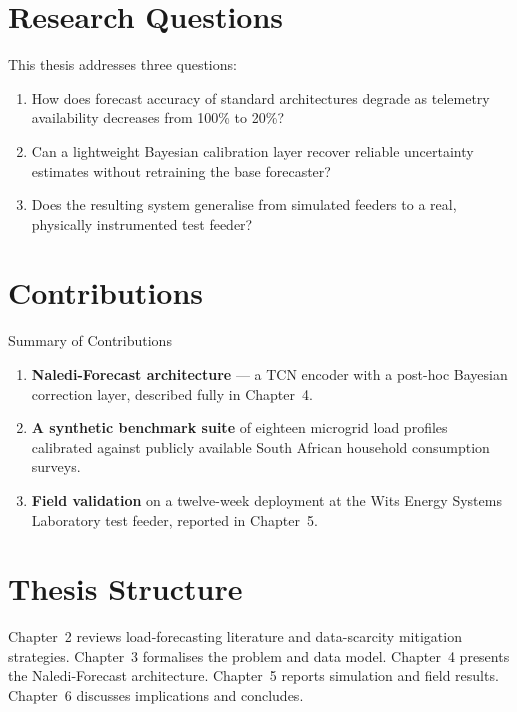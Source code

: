 \documentclass[12pt,a4paper]{report}
\begin{document}
\section{Research Questions}
This thesis addresses three questions:
\begin{enumerate}
  \item How does forecast accuracy of standard architectures degrade as telemetry
        availability decreases from 100\% to 20\%?
  \item Can a lightweight Bayesian calibration layer recover reliable uncertainty estimates
        without retraining the base forecaster?
  \item Does the resulting system generalise from simulated feeders to a real, physically
        instrumented test feeder?
\end{enumerate}

\section{Contributions}
\begin{contribbox}{Summary of Contributions}
\begin{enumerate}
  \item \textbf{Naledi-Forecast architecture} --- a TCN encoder with a post-hoc Bayesian
        correction layer, described fully in Chapter~4.
  \item \textbf{A synthetic benchmark suite} of eighteen microgrid load profiles calibrated
        against publicly available South African household consumption surveys.
  \item \textbf{Field validation} on a twelve-week deployment at the Wits Energy Systems
        Laboratory test feeder, reported in Chapter~5.
\end{enumerate}
\end{contribbox}

\section{Thesis Structure}
Chapter~2 reviews load-forecasting literature and data-scarcity mitigation strategies.
Chapter~3 formalises the problem and data model. Chapter~4 presents the Naledi-Forecast
architecture. Chapter~5 reports simulation and field results. Chapter~6 discusses
implications and concludes.

\end{document}
